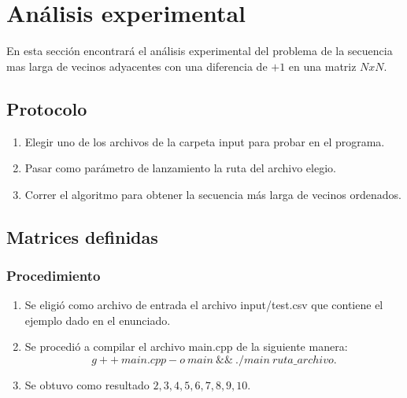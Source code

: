 \documentclass[letter]{article}
\begin{document}
\section{An\'alisis experimental}
En esta secci\'on encontrar\'a el an\'alisis experimental del problema de la secuencia mas larga de vecinos adyacentes con una diferencia de $+1$ en una matriz $NxN$.
\subsection{Protocolo}
\begin{enumerate}
	\item Elegir uno de los archivos de la carpeta input para probar en el programa.
	\item Pasar como par\'ametro de lanzamiento la ruta del archivo elegio.
	\item Correr el algoritmo para obtener la secuencia m\'as larga de vecinos ordenados.
\end{enumerate}
\subsection{Matrices definidas}
\subsubsection{Procedimiento}
\begin{enumerate}
	\item Se eligi\'o como archivo de entrada el archivo input/test.csv que contiene el ejemplo dado en el enunciado.
	\item Se procedi\'o a compilar el archivo main.cpp de la siguiente manera: $$g++ ~ main.cpp -o ~ main ~ \&\& ~ ./main ~ ruta\_archivo.$$
	\item Se obtuvo como resultado $2,3,4,5,6,7,8,9,10$.
\end{enumerate}
\newpage
\end{document}

